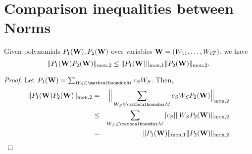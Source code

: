 \section{Comparison inequalities between Norms}\label{sec-useful-appendix3}
	

\begin{cl}							\label{cl:compare_masses2}					
	Given polynomials $P_1({\bf W}),P_2({\bf W})$ over variables ${\bf W} = (W_{11},\ldots,W_{1T})$, we have 
$$\|P_1({\bf W})P_2({\bf W})\|_{\rm mon,2} \le \|P_1({\bf W})\|_{\rm mon,1}\|P_2({\bf W})\|_{\rm mon,2}.$$
\end{cl}
\begin{proof}
	Let $P_1({\bf W}) = \sum_{W_S \in \mcb{M}} c_SW_S$. Then,
	\begin{eqnarray*}
	\|P_1({\bf W})P_2({\bf W})\|_{\rm mon,2} &=& \Big\|\sum_{W_S \in \mcb{M}} c_SW_SP_2({\bf W})\Big\|_{\rm mon,2} \\
	&\le& \sum_{W_S \in \mcb{M}}|c_S|\|W_SP_2({\bf W})\|_{\rm mon,2} \\
	&=& \|P_1({\bf W})\|_{\rm mon,1}\|P_2({\bf W})\|_{\rm mon,2}
	\end{eqnarray*}
\end{proof}


